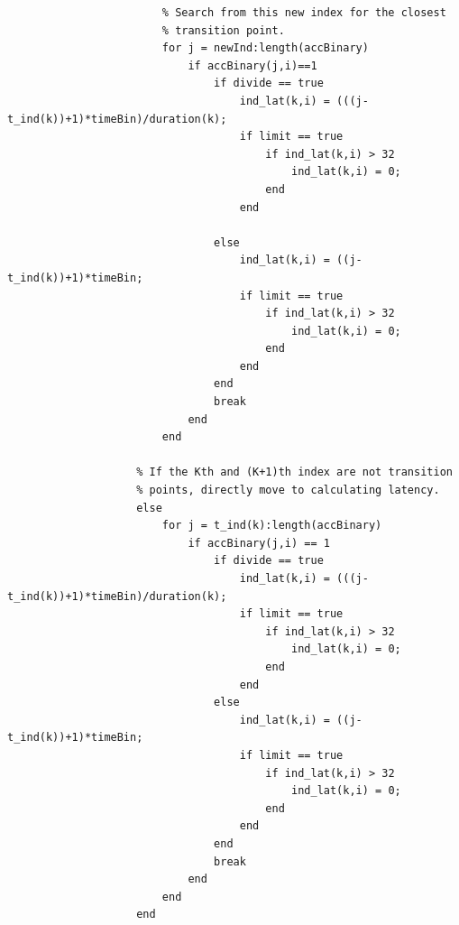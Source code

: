 \begin{lstlisting}
                        % Search from this new index for the closest
                        % transition point. 
                        for j = newInd:length(accBinary)
                            if accBinary(j,i)==1
                                if divide == true
                                    ind_lat(k,i) = (((j-t_ind(k))+1)*timeBin)/duration(k);
                                    if limit == true
                                        if ind_lat(k,i) > 32 
                                            ind_lat(k,i) = 0; 
                                        end
                                    end

                                else
                                    ind_lat(k,i) = ((j-t_ind(k))+1)*timeBin;
                                    if limit == true
                                        if ind_lat(k,i) > 32 
                                            ind_lat(k,i) = 0; 
                                        end
                                    end
                                end
                                break
                            end
                        end
                    
                    % If the Kth and (K+1)th index are not transition
                    % points, directly move to calculating latency.
                    else 
                        for j = t_ind(k):length(accBinary)
                            if accBinary(j,i) == 1
                                if divide == true
                                    ind_lat(k,i) = (((j-t_ind(k))+1)*timeBin)/duration(k);
                                    if limit == true
                                        if ind_lat(k,i) > 32 
                                            ind_lat(k,i) = 0; 
                                        end
                                    end
                                else
                                    ind_lat(k,i) = ((j-t_ind(k))+1)*timeBin;
                                    if limit == true
                                        if ind_lat(k,i) > 32 
                                            ind_lat(k,i) = 0; 
                                        end
                                    end
                                end
                                break
                            end
                        end
                    end
    

\end{lstlisting}
